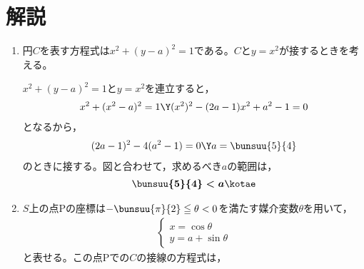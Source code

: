 \documentclass[../../../doc/main]{subfiles}
\begin{document}
    \setcounter{chapter}{3}
    \setcounter{section}{2}
    \section{解説}\label{解説3}
    \begin{enumerate}
        \item [\kakkoichi] 円$C$を表す方程式は$x^2+(y-a)^2=1$である。$C$と$y=x^2$が接するときを考える。
            \begin{mawarikomi}{}{
            }
            $x^2+(y-a)^2=1$と$y=x^2$を連立すると，
            \begin{align*}
                x^2+(x^2-a)^2=1 \Y (x^2)^2-(2a-1)x^2+a^2-1=0
            \end{align*}
            となるから，
            \begin{align*}
                (2a-1)^2-4(a^2-1)=0 \Y a=\bunsuu{5}{4}
            \end{align*}
            のときに接する。図と合わせて，求めるべき$a$の範囲は，
            \begin{align*}
                \boldsymbol{\bunsuu{5}{4}<a}\kotae
            \end{align*}
        \end{mawarikomi}
        \item [\kakkoni] $S$上の点Pの座標は$-\bunsuu{\pi}{2}\leqq\theta<0$を満たす媒介変数$\theta$を用いて，
            \begin{align*}
                \left\{
                    \begin{array}{l}
                        x=\cos{\theta} \\
                        y=a+\sin{\theta}
                    \end{array}
                \right.
            \end{align*}
            と表せる。この点Pでの$C$の接線の方程式は，
            \begin{align*}

\end{align*}
\end{enumerate}
\end{document}

